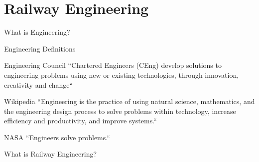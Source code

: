 \documentclass[
    aspectratio=169
]{beamer}
\begin{document}
\section{Railway Engineering}

\begin{frame}{What is Engineering?}
\end{frame}

\begin{frame}{Engineering Definitions}
	\begin{exampleblock}{Engineering Council}
		``Chartered Engineers (CEng) develop solutions to engineering problems using new or existing technologies, through innovation, creativity and change``
	\end{exampleblock}
	\begin{exampleblock}{Wikipedia}
		``Engineering is the practice of using natural science, mathematics, and the engineering design process to solve problems within technology, increase efficiency and productivity, and improve systems.``
	\end{exampleblock}
	\begin{exampleblock}{NASA}
		``Engineers solve problems.``
	\end{exampleblock}
\end{frame}

\begin{frame}{What is Railway Engineering?}
	
\end{frame}
\end{document}
